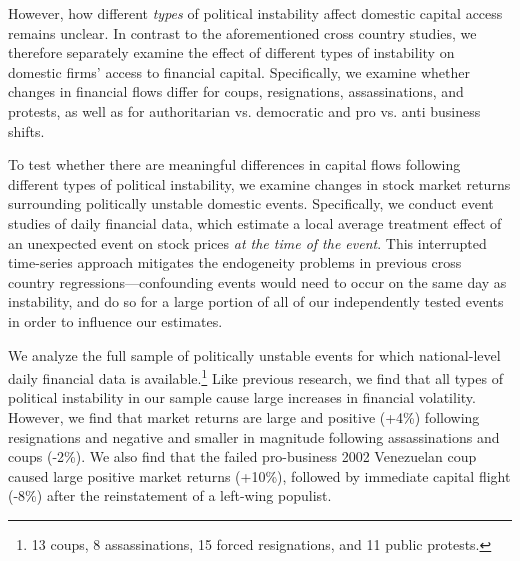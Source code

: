\documentclass[12pt,final,fleqn]{article}
\theoremstyle{plain}
\begin{document}



However, how different \textit{types} of political instability affect domestic capital access remains unclear. In contrast to the aforementioned cross country studies, we therefore separately examine the effect of different types of instability on domestic firms' access to financial capital. Specifically, we examine whether changes in financial flows differ for coups, resignations, assassinations, and protests, as well as for authoritarian vs. democratic and pro vs. anti business shifts. 

To test whether there are meaningful differences in capital flows following different types of political instability, we examine changes in stock market returns surrounding politically unstable domestic events. Specifically, we conduct event studies of daily financial data, which estimate a local average treatment effect of an unexpected event on stock prices \textit{at the time of the event}. This interrupted time-series approach mitigates the endogeneity problems in previous cross country regressions---confounding events would need to occur on the same day as instability, and do so for a large portion of all of our independently tested events in order to influence our estimates.



We analyze the full sample of politically unstable events for which national-level daily financial data is available.\footnote{13 coups, 8 assassinations, 15 forced resignations, and 11 public protests.}  Like previous research, we find that all types of political instability in our sample cause large increases in financial volatility. However, we find that market returns are large and positive (+4\%) following resignations and negative and smaller in magnitude following assassinations and coups (-2\%). We also find that the failed pro-business 2002 Venezuelan coup caused large positive market returns (+10\%), followed by immediate capital flight (-8\%) after the reinstatement of a left-wing populist.
\end{document}
